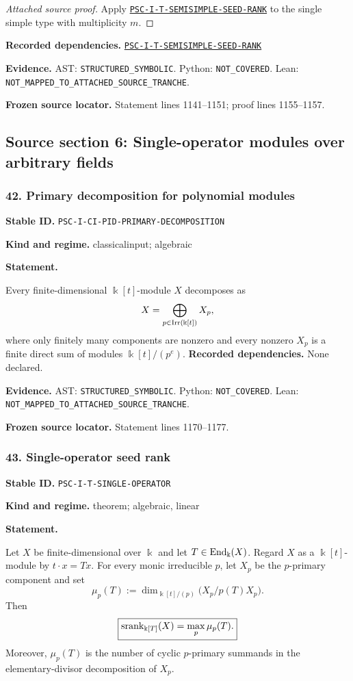 \documentclass[a4paper,11pt]{article}
\newcommand{\bbk}{\Bbbk}\newcommand{\A}{\mathcal A}\newcommand{\B}{\mathcal B}\newcommand{\Ccal}{\mathcal C}\newcommand{\Pcal}{\mathcal P}\newcommand{\Qcal}{\mathcal Q}\newcommand{\Rcal}{\mathcal R}\newcommand{\Scal}{\mathcal S}
\newcommand{\field}[2]{\noindent\textbf{#1.} #2\par}
\begin{document}
\begin{proof}[Attached source proof]
Apply \hyperref[rec:PSC-I-T-SEMISIMPLE-SEED-RANK]{\nolinkurl{PSC-I-T-SEMISIMPLE-SEED-RANK}} to the single simple type with multiplicity $m$.
\end{proof}
\field{Recorded dependencies}{\hyperref[rec:PSC-I-T-SEMISIMPLE-SEED-RANK]{\nolinkurl{PSC-I-T-SEMISIMPLE-SEED-RANK}}}
\field{Evidence}{AST: \nolinkurl{STRUCTURED_SYMBOLIC}. Python: \nolinkurl{NOT_COVERED}. Lean: \nolinkurl{NOT_MAPPED_TO_ATTACHED_SOURCE_TRANCHE}.}
\field{Frozen source locator}{Statement lines 1141--1151; proof lines 1155--1157.}
\clearpage\subsection{Source section 6: Single-operator modules over arbitrary fields}
\subsubsection*{42. Primary decomposition for polynomial modules}
\label{rec:PSC-I-CI-PID-PRIMARY-DECOMPOSITION}
\field{Stable ID}{\nolinkurl{PSC-I-CI-PID-PRIMARY-DECOMPOSITION}}
\field{Kind and regime}{classicalinput; algebraic}
\textbf{Statement.}\par
Every finite-dimensional $\bbk[t]$-module $X$ decomposes as
\[
X=\bigoplus_{p\in\Irr(\bbk[t])}X_p,
\]
where only finitely many components are nonzero and every nonzero $X_p$ is a finite direct sum of modules $\bbk[t]/(p^e)$.
\field{Recorded dependencies}{None declared.}
\field{Evidence}{AST: \nolinkurl{STRUCTURED_SYMBOLIC}. Python: \nolinkurl{NOT_COVERED}. Lean: \nolinkurl{NOT_MAPPED_TO_ATTACHED_SOURCE_TRANCHE}.}
\field{Frozen source locator}{Statement lines 1170--1177.}
\subsubsection*{43. Single-operator seed rank}
\label{rec:PSC-I-T-SINGLE-OPERATOR}
\field{Stable ID}{\nolinkurl{PSC-I-T-SINGLE-OPERATOR}}
\field{Kind and regime}{theorem; algebraic, linear}
\textbf{Statement.}\par
Let $X$ be finite-dimensional over $\bbk$ and let $T\in\End_{\bbk}(X)$.  Regard $X$ as a $\bbk[t]$-module by $t\cdot x=Tx$.  For every monic irreducible $p$, let $X_p$ be the $p$-primary component and set
\[
\mu_p(T):=
\dim_{\bbk[t]/(p)}\bigl(X_p/p(T)X_p\bigr).
\]
Then
\[
\boxed{
\srank_{\bbk[T]}(X)=\max_p\mu_p(T).
}
\]
Moreover, $\mu_p(T)$ is the number of cyclic $p$-primary summands in the elementary-divisor decomposition of $X_p$.
\end{document}
